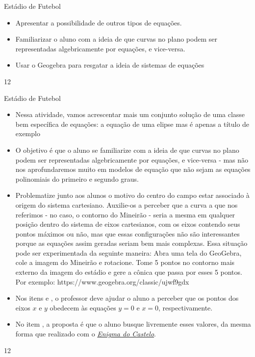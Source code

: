 \clearpage
\def\currentcolor{session2}
\begin{objectives}{Estádio de Futebol}
{
\begin{itemize}
\item Apresentar a possibilidade de outros tipos de equações.
\item Familiarizar o aluno com a ideia de que curvas no plano podem ser representadas algebricamente por equações, e vice-versa.
\item Usar o Geogebra para resgatar a ideia de sistemas de equações
\end{itemize}
}{1}{2}
\end{objectives}
\marginpar{\vspace{-2.5em}}
\begin{sugestions}{Estádio de Futebol}
{
\begin{itemize}
\item  Nessa atividade, vamos acrescentar mais um conjunto solução de uma classe bem específica de equações: a equação de uma elipse mas é apenas a título de exemplo
\item O objetivo é que o aluno se familiarize com a ideia de que curvas no plano podem ser representadas algebricamente por equações, e vice-versa - mas não nos aprofundaremos muito em modelos de equação que não sejam as equações polinomiais do primeiro e segundo graus.
\item Problematize junto aos alunos o motivo do centro do campo estar associado à origem do sistema cartesiano. Auxilie-os a perceber que a curva a que nos referimos - no caso, o contorno do Mineirão - seria a mesma em qualquer posição dentro do sistema de eixos cartesianos, com os eixos contendo seus pontos máximos  ou não, mas que essas configurações não são interessantes porque as equações assim geradas seriam bem mais complexas.
Essa situação pode ser experimentada da seguinte maneira: Abra uma tela do GeoGebra, cole a imagem do Mineirão e rotacione. Tome 5 pontos no contorno mais externo da imagem do estádio e gere a cônica que passa por esses 5 pontos. Por exemplo:
{\footnotesize https://www.geogebra.org/classic/ujwf9gdx}  
\item Nos itens  e , o professor deve ajudar o aluno a perceber que os pontos dos eixos $x$ e $y$ obedecem às equações $y=0$  e $x=0$, respectivamente.
\item No item , a proposta é que o aluno busque livremente esses valores, da mesma forma que realizado com o \hyperref[castelo]{\textit{Enigma do Castelo}}.
\end{itemize}
}{1}{2}
\end{sugestions}

